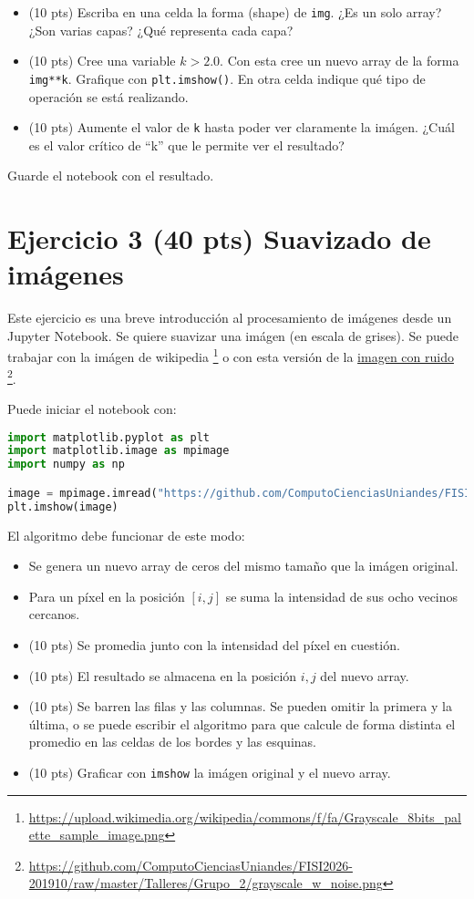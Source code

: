 \documentclass{article}
\begin{document}
\begin{itemize}
\item (10 pts) Escriba en una celda la forma (shape) de \texttt{img}.
  ¿Es un solo array? ¿Son varias capas? ¿Qué representa cada capa?
\item (10 pts) Cree una variable $k>2.0$. Con esta cree un nuevo array
  de la forma \texttt{img**k}. Grafique con \texttt{plt.imshow()}.
  En otra celda indique qué tipo de operación se está realizando.
\item (10 pts) Aumente el valor de \texttt{k} hasta poder ver claramente la
  imágen. ¿Cuál es el valor crítico de ``k'' que le permite ver el resultado?
\end{itemize}
Guarde el notebook con el resultado.


\section{Ejercicio 3 (40 pts) Suavizado de imágenes}

Este ejercicio es una breve introducción al procesamiento de imágenes
desde un Jupyter Notebook.
Se quiere suavizar una imágen (en escala de grises). Se puede trabajar con 
la imágen de wikipedia
\footnote{\url{https://upload.wikimedia.org/wikipedia/commons/f/fa/Grayscale_8bits_palette_sample_image.png}} 
o con esta versión de la 
\href{https://github.com/ComputoCienciasUniandes/FISI2026-201910/raw/master/Talleres/Grupo_2/grayscale_w_noise.png}{imagen con ruido}
\footnote{\url{https://github.com/ComputoCienciasUniandes/FISI2026-201910/raw/master/Talleres/Grupo_2/grayscale_w_noise.png}}.

Puede iniciar el notebook con:
\begin{lstlisting}[language=Python]
import matplotlib.pyplot as plt
import matplotlib.image as mpimage
import numpy as np

image = mpimage.imread("https://github.com/ComputoCienciasUniandes/FISI2026-201910/raw/master/Talleres/Grupo_2/grayscale_w_noise.png")
plt.imshow(image)
\end{lstlisting}

El algoritmo debe funcionar de este modo:
\begin{itemize}
\item Se genera un nuevo array de ceros del mismo tamaño que la imágen original.
\item Para un píxel en la posición $[i,j]$ se suma la intensidad de sus ocho vecinos cercanos. 
\item (10 pts) Se promedia junto con la intensidad del píxel en cuestión.
\item (10 pts) El resultado se almacena en la posición ${i,j}$ del nuevo array.
\item (10 pts) Se barren las filas y las columnas. Se pueden omitir la primera y la última, o se
  puede escribir el algoritmo para que calcule de forma distinta el promedio en las celdas
  de los bordes y las esquinas.
\item (10 pts) Graficar con \texttt{imshow} la imágen original y el nuevo array.
\end{itemize}
\end{document}
